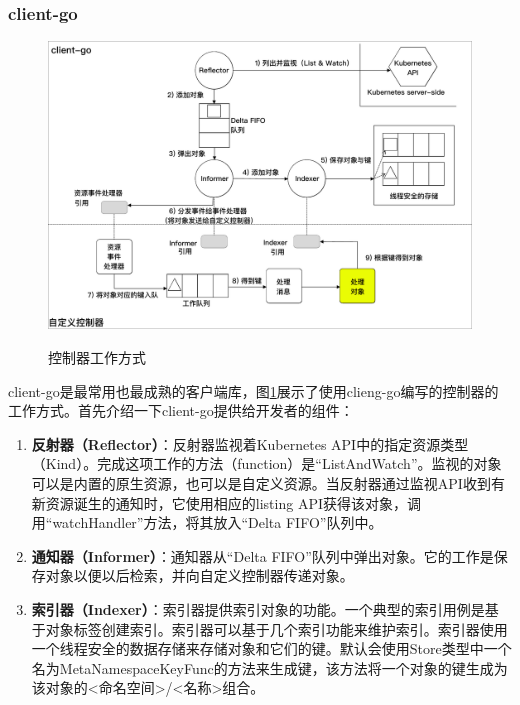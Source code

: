 \documentclass[macfonts,master]{njuthesis}
\begin{document}
\subsubsection{client-go}

\begin{figure}[htbp]
  \centering
  \includegraphics[width=1\textwidth]{pics/client-go-controller-interaction.pdf}\\
  \caption{控制器工作方式}\label{fig:client-go-controller-interaction}
\end{figure}

client-go是最常用也最成熟的客户端库，图\ref{fig:client-go-controller-interaction}展示了使用clieng-go编写的控制器的工作方式。首先介绍一下client-go提供给开发者的组件：
\begin{enumerate}
	\item \textbf{反射器（Reflector）}：反射器监视着Kubernetes API中的指定资源类型（Kind）。完成这项工作的方法（function）是``ListAndWatch''。监视的对象可以是内置的原生资源，也可以是自定义资源。当反射器通过监视API收到有新资源诞生的通知时，它使用相应的listing API获得该对象，调用``watchHandler''方法，将其放入``Delta FIFO''队列中。
	\item \textbf{通知器（Informer）}：通知器从``Delta FIFO''队列中弹出对象。它的工作是保存对象以便以后检索，并向自定义控制器传递对象。
	\item \textbf{索引器（Indexer）}：索引器提供索引对象的功能。一个典型的索引用例是基于对象标签创建索引。索引器可以基于几个索引功能来维护索引。索引器使用一个线程安全的数据存储来存储对象和它们的键。默认会使用Store类型中一个名为MetaNamespaceKeyFunc的方法来生成键，该方法将一个对象的键生成为该对象的<命名空间>/<名称>组合。
\end{enumerate}
\end{document}
